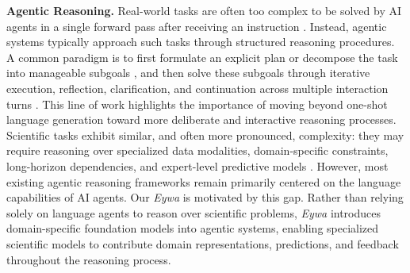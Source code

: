 \documentclass{llmxive}
\begin{document}
{\textbf{Agentic Reasoning.}
Real-world tasks are often too complex to be solved by AI agents in a single forward pass after receiving an instruction \cite{DBLP:journals/corr/abs-2602-07338}. Instead, agentic systems typically approach such tasks through structured reasoning procedures. A common paradigm is to first formulate an explicit plan or decompose the task into manageable subgoals \cite{DBLP:conf/nips/0001ST00Z23,ningmc}, and then solve these subgoals through iterative execution, reflection, clarification, and continuation across multiple interaction turns \cite{DBLP:journals/corr/abs-2509-23537, DBLP:journals/corr/abs-2601-11868, DBLP:journals/corr/abs-2603-00873}. This line of work highlights the importance of moving beyond one-shot language generation toward more deliberate and interactive reasoning processes.
Scientific tasks exhibit similar, and often more pronounced, complexity: they may require reasoning over specialized data modalities, domain-specific constraints, long-horizon dependencies, and expert-level predictive models \cite{jumper2021highly, merchant2023scaling, DBLP:journals/corr/abs-2507-01903, DBLP:journals/corr/abs-2508-14111, DBLP:journals/corr/abs-2511-02864}. However, most existing agentic reasoning frameworks remain primarily centered on the language capabilities of AI agents. Our \textit{Eywa} is motivated by this gap. Rather than relying solely on language agents to reason over scientific problems, \textit{Eywa} introduces domain-specific foundation models into agentic systems, enabling specialized scientific models to contribute domain representations, predictions, and feedback throughout the reasoning process.


}
\end{document}
